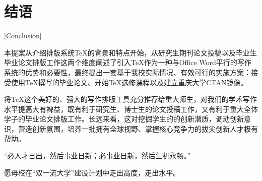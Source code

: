 \section{结语}[Conclusion]

本提案从介绍排版系统\TeX 的背景和特点开始，从研究生期刊论文投稿以及毕业生毕业论文排版工作这两个维度阐述了引入\TeX 作为一种与Office Word平行的写作系统的优势和必要性，最终提出一套基于我校实际情况、有效可行的实施方案：接受使用\TeX 撰写的毕业论文、开始\TeX 选修课程以及建立重庆大学CTAN镜像。

将\TeX 这个美好的、强大的写作排版工具充分推荐给重大师生，对我们的学术写作水平提高大有裨益，既有利于研究生、博士生的论文投稿工作，又有利于重大全体学子的毕业论文排版工作。长远来看，这对挖掘学生的的创新潜质，调动创新意识，营造创新氛围，培养一批拥有全球视野、掌握核心竞争力的拔尖创新人才极有帮助。

“必人才日出，然后事业日新；必事业日新，然后生机永畅。”

愿母校在“双一流大学”建设计划中走出高度，走出水平。